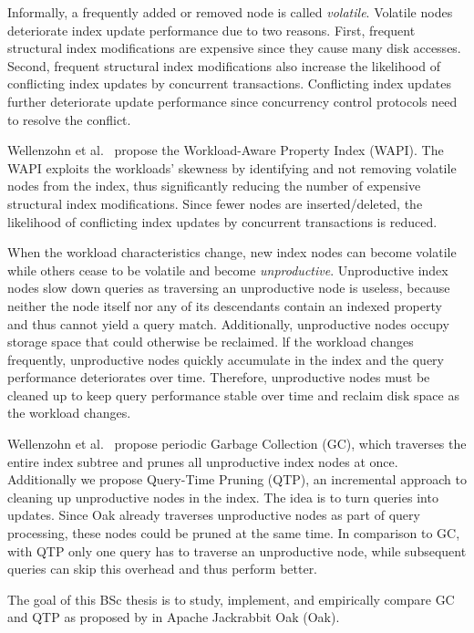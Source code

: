\documentclass[abstracton,12pt]{scrartcl}
\theoremstyle{definition}
\begin{document}
Informally, a frequently added or removed node is called \textit{volatile}.
Volatile nodes deteriorate index update performance due to two reasons. First,
frequent structural index modifications are expensive since they cause many disk
accesses. Second, frequent structural index modifications also increase the
likelihood of conflicting index updates by concurrent transactions. Conflicting
index updates further deteriorate update performance since concurrency control
protocols need to resolve the conflict.

Wellenzohn et al.~\cite{KW17} propose the Workload-Aware Property Index (WAPI).
The WAPI exploits the workloads' skewness by identifying and not removing
volatile nodes from the index, thus significantly reducing the number of
expensive structural index modifications. Since fewer nodes are
inserted/deleted, the likelihood of conflicting index updates by concurrent
transactions is reduced.

When the workload characteristics change, new index nodes can become volatile
while others cease to be volatile and become \textit{unproductive}. Unproductive
index nodes slow down queries as traversing an unproductive node is useless,
because neither the node itself nor any of its descendants contain an indexed
property and thus cannot yield a query match. Additionally, unproductive nodes
occupy storage space that could otherwise be reclaimed. lf the workload changes
frequently, unproductive nodes quickly accumulate in the index and the query
performance deteriorates over time. Therefore, unproductive nodes must be
cleaned up to keep query performance stable over time and reclaim disk space as
the workload changes.

Wellenzohn et al.~\cite{KW17} propose periodic Garbage Collection (GC), which
traverses the entire index subtree and prunes all unproductive index nodes at
once. Additionally we propose Query-Time Pruning (QTP), an incremental approach
to cleaning up unproductive nodes in the index. The idea is to turn queries into
updates. Since Oak already traverses unproductive nodes as part of query
processing, these nodes could be pruned at the same time. In comparison to GC,
with QTP only one query has to traverse an unproductive node, while subsequent
queries can skip this overhead and thus perform better.

The goal of this BSc thesis is to study, implement, and empirically compare GC
and QTP as proposed by \cite{KW17} in Apache Jackrabbit Oak (Oak).

\end{document}
